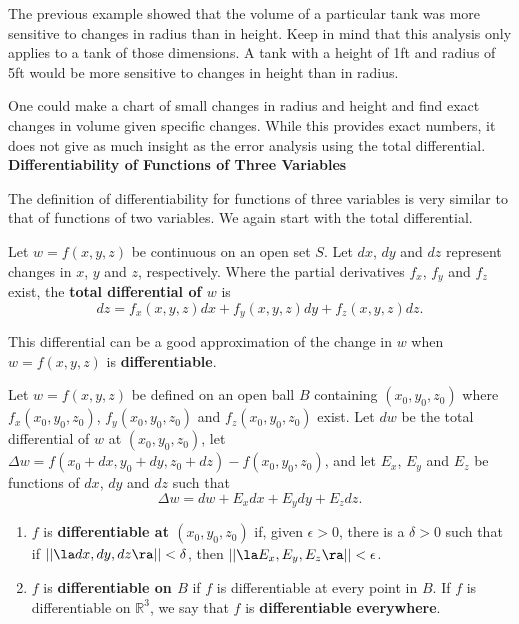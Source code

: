 The previous example showed that the volume of a particular tank was more sensitive to changes in radius than in height. Keep in mind that this analysis only applies to a tank of those dimensions. A tank with a height of 1ft and radius of 5ft would be more sensitive to changes in height than in radius.

One could make a chart of small changes in radius and height and find exact changes in volume given specific changes. While this provides exact numbers, it does not give as much insight as the error analysis using the total differential.\\

\noindent\textbf{\large Differentiability of Functions of Three Variables}

The definition of differentiability for functions of three variables is very similar to that of functions of two variables. We again start with the total differential.

{Let $w=f(x,y,z)$ be continuous on an open set $S$. Let $dx$, $dy$ and $dz$ represent changes in $x$, $y$ and  $z$, respectively. Where the partial derivatives $f_x$, $f_y$ and $f_z$ exist, the \textbf{total differential of $w$} is
$$dz = f_x(x,y,z)dx + f_y(x,y,z)dy+f_z(x,y,z)dz.$$
}

This differential can be a good approximation of the change in $w$ when $w = f(x,y,z)$ is \textbf{differentiable}.

{Let $w=f(x,y,z)$ be defined on an open ball $B$ containing $(x_0,y_0,z_0)$ where $f_x(x_0,y_0,z_0)$, $f_y(x_0,y_0,z_0)$ and $f_z(x_0,y_0,z_0)$ exist. Let $dw$ be the total differential of $w$ at $(x_0,y_0,z_0)$, let $\Delta w = f(x_0+dx,y_0+dy,z_0+dz) - f(x_0,y_0,z_0)$, and let $E_x$, $E_y$ and $E_z$ be functions of $dx$, $dy$ and $dz$  such that
$$\Delta w = dw + E_xdx + E_ydy + E_zdz.$$
\begin{enumerate}
	\item $f$ is \textbf{differentiable at $(x_0,y_0,z_0)$} if, given $\epsilon >0$, there is a $\delta >0$ such that if $||\la dx,dy,dz\ra|| < \delta$, then $||\la E_x,E_y,E_z\ra|| < \epsilon$. 
	\item	$f$ is \textbf{differentiable on $B$} if $f$ is differentiable at every point in $B$. If $f$ is differentiable on $\mathbb{R}^3$, we say that $f$ is \textbf{differentiable everywhere}.
\end{enumerate}
}

